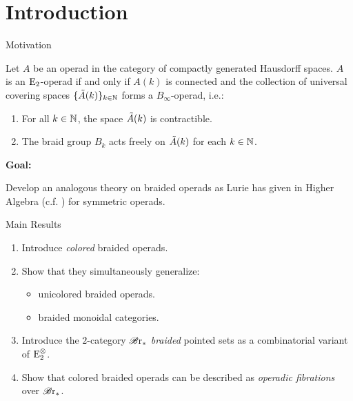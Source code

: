 \section{Introduction}

\begin{frame}{}
    \tableofcontents[currentsection]
\end{frame}

\begin{frame}{Motivation}

    \begin{thm}
        Let $A$ be an operad in the  category of compactly generated
        Hausdorff spaces. $A$ is an $\operatorname{E}_2$-operad if and only if $A(k)$ is connected and the collection of
        universal covering spaces $\{\Tilde{A}(k)\}_{k \in \mathbb{N}}$ forms a
        $B_{\infty}$-operad, i.e.:
        \begin{enumerate}[(1)]
            \item For all $k \in \mathbb{N}$, the space $\Tilde{A}(k)$ is contractible.
            \item The braid group  $B_k$ acts freely on $\Tilde{A}(k)$ for each
            $k \in \mathbb{N}$.
        \end{enumerate}
    \end{thm}

    \medskip
    \pause

    \textbf{Goal:} 
    
    Develop an analogous theory on braided operads as Lurie has given in 
    Higher Algebra (c.f. \cite[Section 2]{ha}) for symmetric operads.
\end{frame}

\begin{frame}{Main Results}
\begin{enumerate}
    \item Introduce {\em colored} braided operads.
    \item Show that they simultaneously generalize:
    \begin{itemize}
        \item unicolored braided operads.
        \item braided monoidal categories.
    \end{itemize}
    \item Introduce the $2$-category $\mathscr{B} \text{r}_{\ast}$ {\em braided} pointed sets as a combinatorial variant of $\operatorname{\operatorname{E}_2^{\otimes}}$.
    \item Show that colored braided operads can be described as {\em operadic fibrations} over $\mathscr{B} \text{r}_{\ast}$.
\end{enumerate}
\end{frame}
